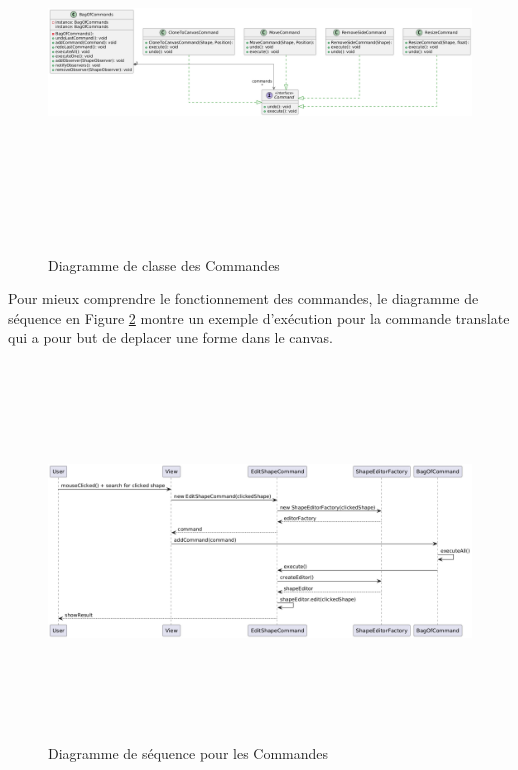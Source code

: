 \documentclass{article}
\begin{document}
\begin{figure}[h]
    \centering
    \includegraphics[width=\textwidth,height=10.0cm,keepaspectratio]{command.png}
    \caption{Diagramme de classe des Commandes}
    \label{Command}
\end{figure}
\FloatBarrier

Pour mieux comprendre le fonctionnement des commandes, le diagramme de séquence en Figure \ref{CommandDS} montre un exemple d'exécution
pour la commande translate qui a pour but de deplacer une forme dans le canvas.

\begin{figure}[h]
    \centering
    \includegraphics[width=\textwidth,height=10.0cm,keepaspectratio]{DS_command.png}
    \caption{Diagramme de séquence pour les Commandes}
    \label{CommandDS}
\end{figure}
\FloatBarrier
\end{document}
